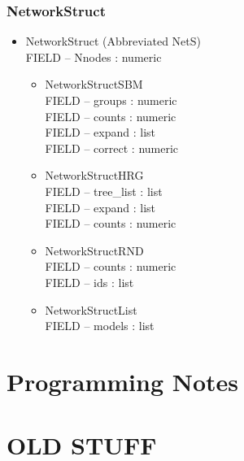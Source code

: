 \documentclass[11pt]{article}
\begin{document}
\subsubsection{NetworkStruct}
\begin{itemize}

\item NetworkStruct (Abbreviated NetS)\\
FIELD -- Nnodes : numeric
\begin{itemize}
\item NetworkStructSBM\\
FIELD -- groups : numeric\\
FIELD -- counts : numeric\\
FIELD -- expand : list\\
FIELD -- correct : numeric\\
\item NetworkStructHRG\\
FIELD -- tree\_list : list\\
FIELD -- expand : list\\
FIELD -- counts : numeric\\
\item NetworkStructRND\\
FIELD -- counts : numeric\\
FIELD -- ids : list\\
\item NetworkStructList\\
FIELD -- models : list\\
\end{itemize}
\end{itemize}












\section{Programming Notes}













\pagebreak

\section{OLD STUFF} 
\end{document}
